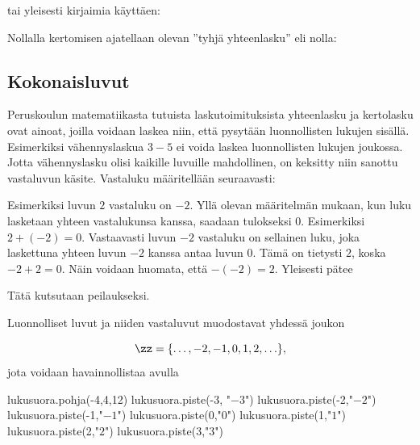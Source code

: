 tai yleisesti kirjaimia käyttäen:

\laatikko{\[m \cdot n = \underbrace{m + m + \ldots + m}_{n\,\text{kpl}} = \underbrace{n + n + \ldots + n}_{m\,\text{kpl}}.\]}

Nollalla kertomisen ajatellaan olevan ''tyhjä yhteenlasku'' eli nolla:
\laatikko{\[0 \cdot m = 0\]}


\subsection*{Kokonaisluvut}

Peruskoulun matematiikasta tutuista laskutoimituksista yhteenlasku ja kertolasku ovat ainoat, joilla voidaan laskea niin, että pysytään luonnollisten lukujen sisällä. Esimerkiksi vähennyslaskua $3-5$ ei voida laskea luonnollisten lukujen joukossa. Jotta vähennyslasku olisi kaikille luvuille mahdollinen, on keksitty niin sanottu vastaluvun käsite. Vastaluku määritellään seuraavasti:


Esimerkiksi luvun $2$ vastaluku on $-2$. Yllä olevan määritelmän mukaan, kun luku lasketaan yhteen vastalukunsa kanssa, saadaan tulokseksi $0$. Esimerkiksi $2+(-2)=0$. Vastaavasti luvun $-2$ vastaluku on sellainen luku, joka laskettuna yhteen luvun $-2$ kanssa antaa luvun $0$. Tämä on tietysti $2$, koska $-2+2=0$. Näin voidaan huomata, että $-(-2)=2$. Yleisesti pätee


Tätä kutsutaan peilaukseksi.

Luonnolliset luvut ja niiden vastaluvut muodostavat yhdessä  joukon

\[\zz = \{\ldots, -2, -1, 0, 1, 2, \ldots\},\] jota voidaan havainnollistaa  avulla

\begin{kuva}
	lukusuora.pohja(-4,4,12)
	lukusuora.piste(-3, "$-3$")
	lukusuora.piste(-2,"$-2$")
	lukusuora.piste(-1,"$-1$")
	lukusuora.piste(0,"$0$")
	lukusuora.piste(1,"$1$")
	lukusuora.piste(2,"$2$")
	lukusuora.piste(3,"$3$")
\end{kuva}

